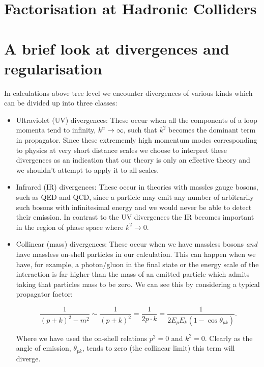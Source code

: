 \section{Factorisation at Hadronic Colliders}

\section{A brief look at divergences and regularisation}

	In calculations above tree level we encounter divergences of various kinds which can be divided up into three classes:

	\begin{itemize}
	  \item Ultraviolet (UV) divergences:  These occur when all the components of a loop momenta tend to infinity, $k^\alpha\rightarrow\infty$, such that $k^2$ becomes the dominant term in propagator.  Since these extrememly high momentum modes corresponding to physics at very short distance scales we choose to 	interpret these divergences as an indication that our theory is only an effective theory and we shouldn't attempt to apply it to all scales.

	  \item Infrared (IR) divergences:  These occur in theories with massles gauge bosons, such as QED and QCD, since a particle may emit any number of arbitrarily such bosons with infinitesimal energy and we would never be able to detect their emission.  In contrast to the UV divergences the IR becomes important 	in the region of phase space where $k^2\rightarrow0$.

	  \item Collinear (mass) divergences: These occur when we have massless bosons \emph{and} have massless on-shell particles in our calculation.  This can happen when we have, for example, a photon/gluon in the final state or the energy scale of the interaction is far higher than the mass of an emitted particle 	which admits taking that particles mass to be zero.  We can see this by considering a typical propagator factor:

	  \begin{equation}
	  \frac{1}{(p+k)^2-m^2}\sim\frac{1}{(p+k)^2} = \frac{1}{2p\cdot k} = \frac{1}{2E_pE_k(1-\cos\theta_{pk})}.
	  \end{equation}

	  Where we have used the on-shell relations $p^2=0$ and $k^2=0$.  Clearly as the angle of emission, $\theta_{pk}$, tends to zero (the collinear limit) this term will diverge.
	\end{itemize}

